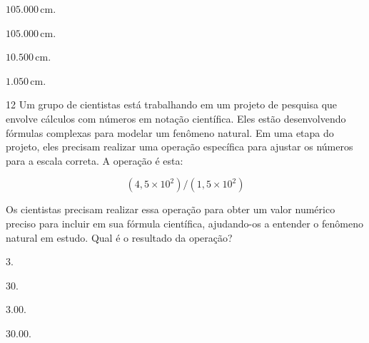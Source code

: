 \begin{escolha}
\item $105.000\,\text{cm}$.

\item $105.000\,\text{cm}$.

\item $10.500\,\text{cm}$.

\item $1.050\,\text{cm}$.
\end{escolha}



\num{12} Um grupo de cientistas está trabalhando em um projeto de pesquisa
que envolve cálculos com números em notação científica. Eles estão desenvolvendo
fórmulas complexas para modelar um fenômeno natural. Em uma etapa do projeto,
eles precisam realizar uma operação específica para ajustar os números para a
escala correta. A operação é esta:

$$(4,5 \times 10^2) / (1,5 \times 10^2)$$

Os cientistas precisam realizar essa operação para obter um valor numérico preciso
para incluir em sua fórmula científica, ajudando-os a entender o fenômeno natural
em estudo. Qual é o resultado da operação?

\begin{escolha}
\item $3$.
\item $30$.
\item $3.00$.
\item $30.00$.
\end{escolha}

